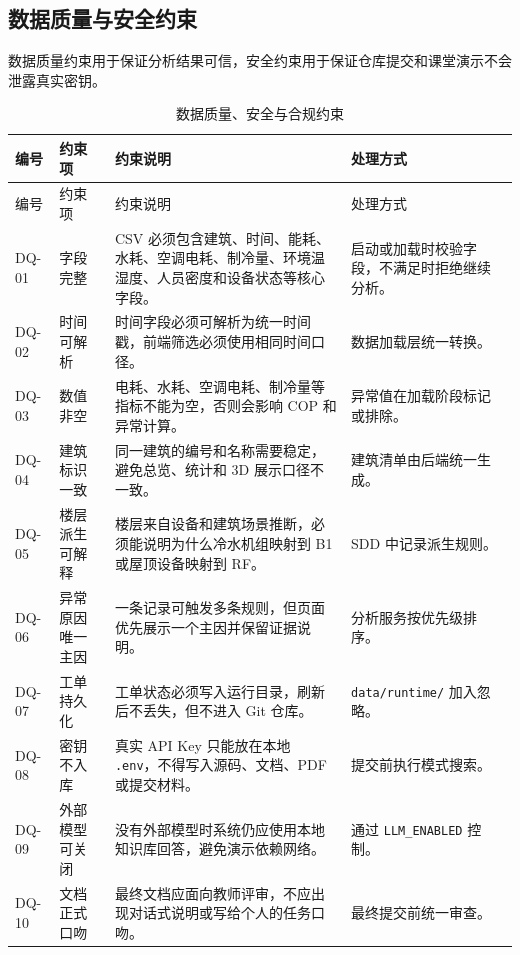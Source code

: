 \documentclass[12pt,a4paper]{ctexart}
\newcommand{\code}[1]{{\footnotesize\nolinkurl{#1}}}
\begin{document}
\subsection{数据质量与安全约束}
数据质量约束用于保证分析结果可信，安全约束用于保证仓库提交和课堂演示不会泄露真实密钥。
\begin{longtable}{L{1.7cm}L{3.0cm}L{6.0cm}L{4.5cm}}
\caption{数据质量、安全与合规约束}\\
\toprule
编号 & 约束项 & 约束说明 & 处理方式 \\
\midrule
\endfirsthead
\toprule
编号 & 约束项 & 约束说明 & 处理方式 \\
\midrule
\endhead
DQ-01 & 字段完整 & CSV 必须包含建筑、时间、能耗、水耗、空调电耗、制冷量、环境温湿度、人员密度和设备状态等核心字段。 & 启动或加载时校验字段，不满足时拒绝继续分析。 \\
DQ-02 & 时间可解析 & 时间字段必须可解析为统一时间戳，前端筛选必须使用相同时间口径。 & 数据加载层统一转换。 \\
DQ-03 & 数值非空 & 电耗、水耗、空调电耗、制冷量等指标不能为空，否则会影响 COP 和异常计算。 & 异常值在加载阶段标记或排除。 \\
DQ-04 & 建筑标识一致 & 同一建筑的编号和名称需要稳定，避免总览、统计和 3D 展示口径不一致。 & 建筑清单由后端统一生成。 \\
DQ-05 & 楼层派生可解释 & 楼层来自设备和建筑场景推断，必须能说明为什么冷水机组映射到 B1 或屋顶设备映射到 RF。 & SDD 中记录派生规则。 \\
DQ-06 & 异常原因唯一主因 & 一条记录可触发多条规则，但页面优先展示一个主因并保留证据说明。 & 分析服务按优先级排序。 \\
DQ-07 & 工单持久化 & 工单状态必须写入运行目录，刷新后不丢失，但不进入 Git 仓库。 & \code{data/runtime/} 加入忽略。 \\
DQ-08 & 密钥不入库 & 真实 API Key 只能放在本地 \code{.env}，不得写入源码、文档、PDF 或提交材料。 & 提交前执行模式搜索。 \\
DQ-09 & 外部模型可关闭 & 没有外部模型时系统仍应使用本地知识库回答，避免演示依赖网络。 & 通过 \code{LLM_ENABLED} 控制。 \\
DQ-10 & 文档正式口吻 & 最终文档应面向教师评审，不应出现对话式说明或写给个人的任务口吻。 & 最终提交前统一审查。 \\
\bottomrule
\end{longtable}
\end{document}
